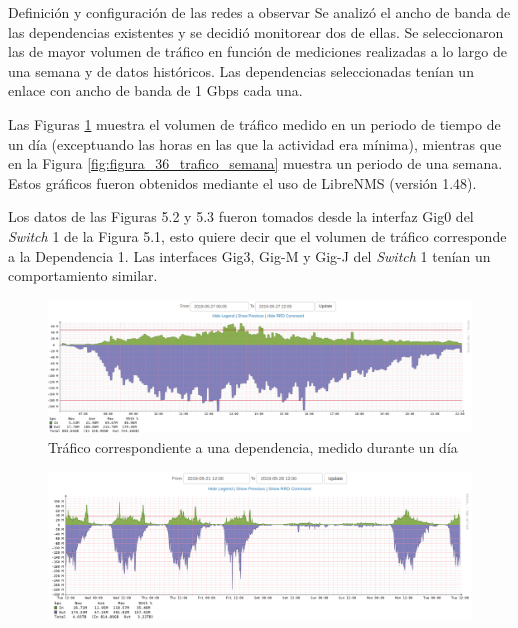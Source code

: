     \begin{subsection}{Definición y configuración de las redes a observar}
    Se analizó el ancho de banda de las dependencias existentes y se decidió monitorear dos de ellas. Se seleccionaron las de mayor volumen de tráfico en función de mediciones realizadas a lo largo de una semana y de datos históricos. Las dependencias seleccionadas tenían un enlace con ancho de banda de 1 Gbps cada una. \par
    Las Figuras \ref{fig:figura_35_trafico_dia} muestra el volumen de tráfico medido en un periodo de tiempo de un día (exceptuando las horas en las que la actividad era mínima), mientras que en la Figura \ref{fig:figura_36_trafico_semana} muestra un periodo de una semana. Estos gráficos fueron obtenidos mediante el uso de LibreNMS \cite{librenms} (versión 1.48).\par
    Los datos de las Figuras 5.2 y 5.3 fueron tomados desde la interfaz Gig0 del \textit{Switch} 1 de la Figura 5.1, esto quiere decir que el volumen de tráfico corresponde a la Dependencia 1. Las interfaces Gig3, Gig-M y Gig-J del \textit{Switch} 1 tenían un comportamiento similar.\par
    \begin{figure}[H]
    \centering
    \includegraphics[width=1\textwidth]{./iteracion_1_imagenes/figura_35_trafico_dia.png}
    \caption{Tráfico correspondiente a una dependencia, medido durante un día }
    \label{fig:figura_35_trafico_dia}
    \end{figure}
    \begin{figure}[H]
    \centering
    \includegraphics[width=1\textwidth]{./iteracion_1_imagenes/figura_36_trafico_semana_editada.png}

\end{figure}
\end{subsection}
